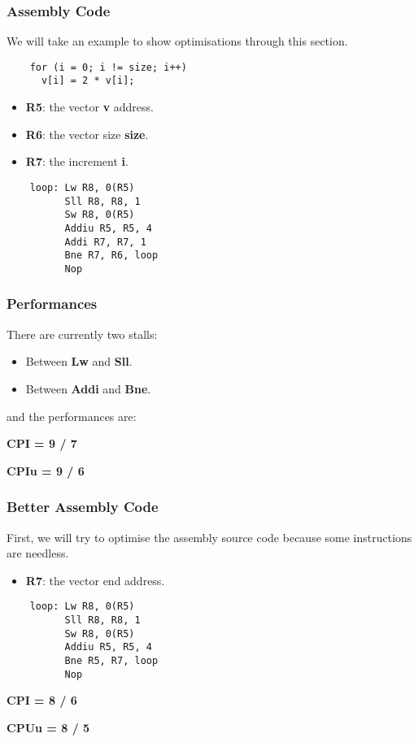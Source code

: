 \begin{frame}[containsverbatim]
  \frametitle{Assembly Code}

  We will take an example to show optimisations through this section.

  \begin{verbatim}
    for (i = 0; i != size; i++)
      v[i] = 2 * v[i];
  \end{verbatim}

  \begin{itemize}
    \item
      \textbf{R5}: the vector \textbf{v} address.
    \item
      \textbf{R6}: the vector size \textbf{size}.
    \item
      \textbf{R7}: the increment \textbf{i}.
  \end{itemize}

  \begin{verbatim}
    loop: Lw R8, 0(R5)
          Sll R8, R8, 1
          Sw R8, 0(R5)
          Addiu R5, R5, 4
          Addi R7, R7, 1
          Bne R7, R6, loop
          Nop
  \end{verbatim}
\end{frame}


\begin{frame}
  \frametitle{Performances}

  There are currently two stalls:

  \begin{itemize}[<+->]
    \item
      Between \textbf{Lw} and \textbf{Sll}.
    \item
      Between \textbf{Addi} and \textbf{Bne}.
  \end{itemize}

  and the performances are:

  \nl

  \textbf{CPI = 9 / 7}

  \textbf{CPIu = 9 / 6}
\end{frame}


\begin{frame}[containsverbatim]
  \frametitle{Better Assembly Code}

  First, we will try to optimise the assembly source code because
  some instructions are needless.

  \begin{itemize}
    \item
      \textbf{R7}: the vector end address.
  \end{itemize}

  \begin{verbatim}
    loop: Lw R8, 0(R5)
          Sll R8, R8, 1
          Sw R8, 0(R5)
          Addiu R5, R5, 4
          Bne R5, R7, loop
          Nop
  \end{verbatim}

  \textbf{CPI = 8 / 6}

  \textbf{CPUu = 8 / 5}
\end{frame}

